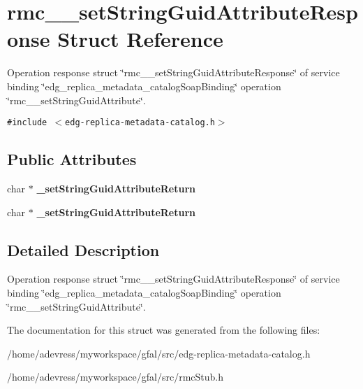\section{rmc\_\-\_\-set\-String\-Guid\-Attribute\-Response Struct Reference}
\label{structrmc____setStringGuidAttributeResponse}
Operation response struct \char`\"{}rmc\_\-\_\-set\-String\-Guid\-Attribute\-Response\char`\"{} of service binding \char`\"{}edg\_\-replica\_\-metadata\_\-catalog\-Soap\-Binding\char`\"{} operation \char`\"{}rmc\_\-\_\-set\-String\-Guid\-Attribute\char`\"{}.  


{\tt \#include $<$edg-replica-metadata-catalog.h$>$}

\subsection*{Public Attributes}
\begin{CompactItemize}
\item 
char $\ast$ \textbf{\_\-set\-String\-Guid\-Attribute\-Return}\label{structrmc____setStringGuidAttributeResponse_dcee69ff9ba25e58e7a504fbbf7f0140}

\item 
char $\ast$ \textbf{\_\-set\-String\-Guid\-Attribute\-Return}\label{structrmc____setStringGuidAttributeResponse_dcee69ff9ba25e58e7a504fbbf7f0140}

\end{CompactItemize}


\subsection{Detailed Description}
Operation response struct \char`\"{}rmc\_\-\_\-set\-String\-Guid\-Attribute\-Response\char`\"{} of service binding \char`\"{}edg\_\-replica\_\-metadata\_\-catalog\-Soap\-Binding\char`\"{} operation \char`\"{}rmc\_\-\_\-set\-String\-Guid\-Attribute\char`\"{}. 



The documentation for this struct was generated from the following files:\begin{CompactItemize}
\item 
/home/adevress/myworkspace/gfal/src/edg-replica-metadata-catalog.h\item 
/home/adevress/myworkspace/gfal/src/rmc\-Stub.h\end{CompactItemize}
